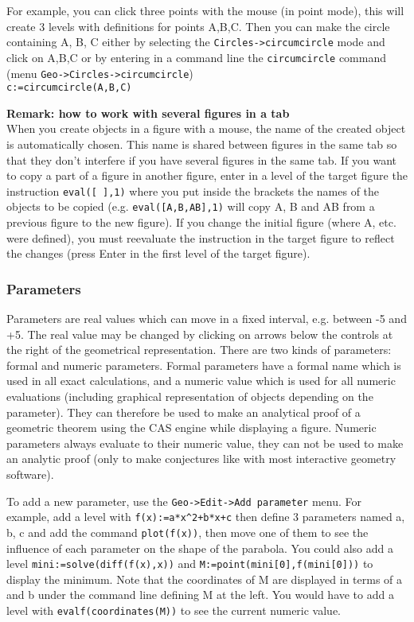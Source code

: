 \documentclass{article}
\begin{document}
For example, you can click three points with the mouse (in point mode),
this will create 3 levels with definitions for points A,B,C.
Then you can make the circle containing A, B, C either by selecting
the \verb|Circles->circumcircle| mode and click on A,B,C
or by entering in a command line the
\verb|circumcircle| command (menu \verb|Geo->Circles->circumcircle|)\\
\verb|c:=circumcircle(A,B,C)|

{\bf Remark: how to work with several figures in a tab}\\
When you create objects in a figure with a mouse, 
the name of the created object is
automatically chosen. This name is shared between figures in the same
tab so that they don't interfere if you have several figures in the
same tab. If you want to copy a part of a figure in another figure,
enter in a level of the target figure
the instruction {\tt eval([ ],1)} where you put inside the brackets
the names of the objects to be copied (e.g. {\tt eval([A,B,AB],1)}
will copy A, B and AB from a previous figure to the new figure). 
If you change the initial figure (where A,
etc. were defined), you must reevaluate the instruction in the target figure
to reflect the changes (press Enter in the first level of the target figure).

\subsubsection{Parameters}
Parameters are real values which can move in a fixed interval, e.g.
between -5 and +5. The real value may be changed by clicking on arrows
below the controls at the right of the geometrical
representation. There are two kinds of parameters: formal
and numeric parameters. Formal parameters have a formal name
which is used in all exact calculations, and a numeric value
which is used for all numeric evaluations (including graphical representation
of objects depending on the parameter). They can therefore be used
to make an analytical proof of a geometric theorem using 
the CAS engine while displaying
a figure. Numeric parameters always evaluate to their numeric value, 
they can
not be used to make an analytic proof (only to make conjectures 
like with most interactive geometry software).

To add a new parameter, use the {\tt Geo->Edit->Add parameter} menu.
For example, add a level with \verb|f(x):=a*x^2+b*x+c|
then define 3 parameters named a, b, c and add the command
\verb|plot(f(x))|, then move one of them to see the 
influence of each parameter
on the shape of the parabola.
You could also add a level \verb|mini:=solve(diff(f(x),x))| and
\verb|M:=point(mini[0],f(mini[0]))| to display the minimum.
Note  that the coordinates of M are displayed in terms of a and b
under the command line defining M at the left. You would have to add a level with
\verb|evalf(coordinates(M))| to see the current numeric value.
\end{document}
